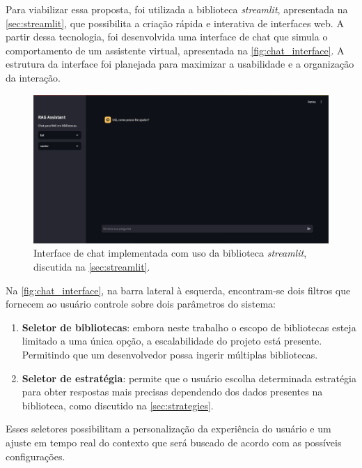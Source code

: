 \documentclass[a4paper, 12pt]{article}
\begin{document}
    Para viabilizar essa proposta, foi utilizada a biblioteca \textit{streamlit}, apresentada na \autoref{sec:streamlit}, que possibilita a criação rápida e interativa de interfaces web. A partir dessa tecnologia, foi desenvolvida uma interface de chat que simula o comportamento de um assistente virtual, apresentada na \autoref{fig:chat_interface}. A estrutura da interface foi planejada para maximizar a usabilidade e a organização da interação.
    
    \begin{figure}[ht]
        \includegraphics[width=\textwidth,height=0.9\textheight,keepaspectratio]{chat-interface.png}
        \centering
        \caption{Interface de chat implementada com uso da biblioteca \textit{streamlit}, discutida na \autoref{sec:streamlit}.}
        \centering
        \label{fig:chat_interface}
    \end{figure}

    Na \autoref{fig:chat_interface}, na barra lateral à esquerda, encontram-se dois filtros que fornecem ao usuário controle sobre dois parâmetros do sistema: 
    
    \begin{enumerate}
        \item \textbf{Seletor de bibliotecas}: embora neste trabalho o escopo de bibliotecas esteja limitado a uma única opção, a escalabilidade do projeto está presente. Permitindo que um desenvolvedor possa ingerir múltiplas bibliotecas.
        \item \textbf{Seletor de estratégia}: permite que o usuário escolha determinada estratégia para obter respostas mais precisas dependendo dos dados presentes na biblioteca, como discutido na \autoref{sec:strategies}.
    \end{enumerate}
    
    Esses seletores possibilitam a personalização da experiência do usuário e um ajuste em tempo real do contexto que será buscado de acordo com as possíveis configurações.
\end{document}
